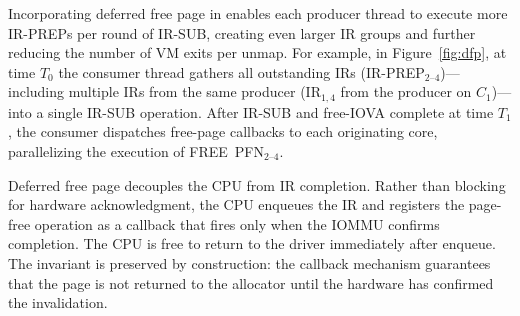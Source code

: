 



Incorporating deferred free page in {\name} enables each producer thread to execute more IR-PREPs per round of IR-SUB,
creating even larger IR groups and further reducing the number of VM exits per unmap.
For example, in Figure~\ref{fig:dfp}, at time $T_0$ the consumer thread gathers
all outstanding IRs (IR-PREP$_{2\text{--}4}$)---including multiple IRs from the same producer
(IR$_{1,4}$ from the producer on $C_1$)---into a single IR-SUB operation.
After IR-SUB and free-IOVA complete at time $T_1$, the consumer dispatches free-page callbacks
to each originating core, parallelizing the execution of FREE~PFN$_{2\text{--}4}$.


Deferred free page decouples the CPU from IR completion. Rather than blocking for hardware acknowledgment, 
    the CPU enqueues the IR and registers the page-free operation 
    as a callback that fires only when the IOMMU confirms completion.
The CPU is free to return to the driver immediately after enqueue.
The invariant is preserved by construction: 
    the callback mechanism guarantees that the page is not returned to the allocator 
    until the hardware has confirmed the invalidation.


    
